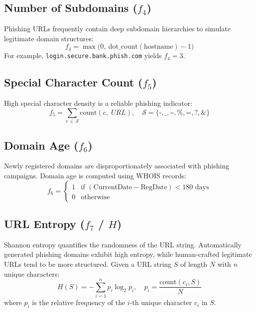 \documentclass[conference]{IEEEtran}
\begin{document}
\subsection{Number of Subdomains ($f_4$)}
Phishing URLs frequently contain deep subdomain hierarchies to 
simulate legitimate domain structures:
\begin{equation}
    f_4 = \max\!\bigl(0,\ 
    \text{dot\_count}(\text{hostname}) - 1\bigr)
    \label{eq:subdomain}
\end{equation}
For example, \texttt{login.secure.bank.phish.com} yields 
$f_4 = 3$.

\subsection{Special Character Count ($f_5$)}
High special character density is a reliable phishing indicator:
\begin{equation}
    f_5 = \sum_{c\,\in\,\mathcal{S}} \text{count}(c,\; URL), \quad
    \mathcal{S} = \bigl\{\texttt{-}, \texttt{\_}, \texttt{\textasciitilde},
    \texttt{\%}, \texttt{=}, \texttt{?}, \texttt{\&}\bigr\}
    \label{eq:special}
\end{equation}

\subsection{Domain Age ($f_6$)}
Newly registered domains are disproportionately associated with 
phishing campaigns. Domain age is computed using WHOIS records:
\begin{equation}
    f_6 = \begin{cases}
        1 & \text{if } (\text{CurrentDate} - \text{RegDate}) 
            < 180\text{ days} \\
        0 & \text{otherwise}
    \end{cases}
    \label{eq:domage}
\end{equation}

\subsection{URL Entropy ($f_7$ / $H$)}
Shannon entropy quantifies the randomness of the URL string. 
Automatically generated phishing domains exhibit high entropy, 
while human-crafted legitimate URLs tend to be more structured. 
Given a URL string $S$ of length $N$ with $n$ unique characters:
\begin{equation}
    H(S) = -\sum_{i=1}^{n} p_i \log_2 p_i, \quad
    p_i = \frac{\text{count}(c_i, S)}{N}
    \label{eq:entropy}
\end{equation}
where $p_i$ is the relative frequency of the $i$-th unique 
character $c_i$ in $S$.
\end{document}
